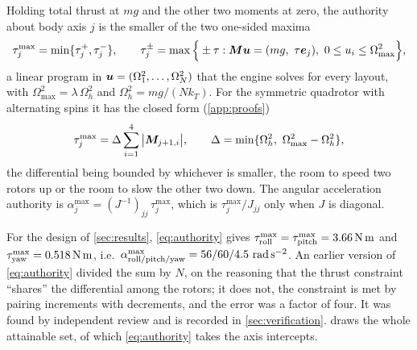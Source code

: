 \begin{definition}
Holding total thrust at $mg$ and the other two moments at zero, the authority
about body axis $j$ is the smaller of the two one-sided maxima
\begin{equation}
  \tau_j^{\max} = \min\{\tau_j^{+},\tau_j^{-}\},
  \qquad
  \tau_j^{\pm} = \max\Big\{\pm\tau :
     \bm{M}\bm{u} = (mg,\ \tau\bm{e}_j),\
     0\le u_i\le\Omega_{\max}^2\Big\} ,
  \label{eq:authority}
\end{equation}
a linear program in $\bm{u}=(\Omega_1^2,\dots,\Omega_N^2)$ that the engine
solves for every layout, with $\Omega_{\max}^2 = \lambda\,\Omega_h^2$ and
$\Omega_h^2 = mg/(Nk_T)$. For the symmetric quadrotor with alternating spins
it has the closed form (\cref{app:proofs})
\begin{equation}
  \tau_j^{\max} = \Delta\sum_{i=1}^{4}\big|\bm{M}_{j+1,i}\big|,
  \qquad
  \Delta = \min\{\Omega_h^2,\ \Omega_{\max}^2-\Omega_h^2\} ,
  \label{eq:authquad}
\end{equation}
the differential being bounded by whichever is smaller, the room to speed two
rotors up or the room to slow the other two down. The angular acceleration
authority is $\alpha_j^{\max} = (J^{-1})_{jj}\,\tau_j^{\max}$, which is
$\tau_j^{\max}/J_{jj}$ only when $J$ is diagonal.
\end{definition}

For the design of \cref{sec:results}, \cref{eq:authority} gives
$\tau_{\mathrm{roll}}^{\max}=\tau_{\mathrm{pitch}}^{\max}=\SI{3.66}{\newton\metre}$
and $\tau_{\mathrm{yaw}}^{\max}=\SI{0.518}{\newton\metre}$, i.e.\
$\alpha^{\max}_{\mathrm{roll}/\mathrm{pitch}/\mathrm{yaw}} =
\rAlphaRoll/\rAlphaPitch/\rAlphaYaw\ \si{\radian\per\second\squared}$. An earlier
version of \cref{eq:authority} divided the sum by $N$, on the reasoning that
the thrust constraint ``shares'' the differential among the rotors; it does
not, the constraint is met by pairing increments with decrements, and the
error was a factor of four. It was found by independent review and is
recorded in \cref{sec:verification}. \Cref{fig:attainable} draws the whole
attainable set, of which \cref{eq:authority} takes the axis intercepts.

